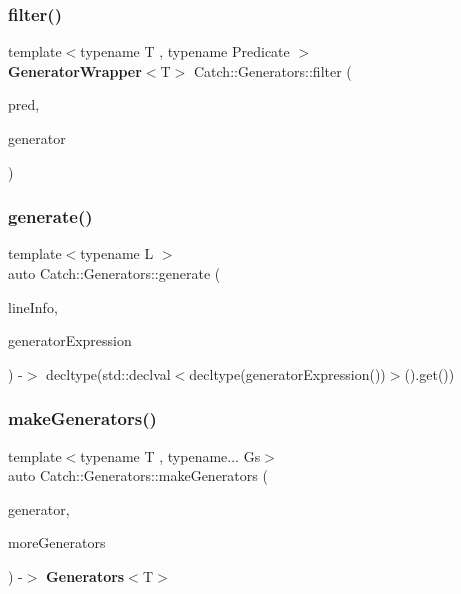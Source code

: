 \mbox{\label{namespace_catch_1_1_generators_afd87f4cbf259f2252aee164d6905b18b}} 
\subsubsection{filter()}
{\footnotesize\ttfamily template$<$typename T , typename Predicate $>$ \\
\textbf{ Generator\+Wrapper}$<$T$>$ Catch\+::\+Generators\+::filter (\begin{DoxyParamCaption}\item[{Predicate \&\&}]{pred,  }\item[{\textbf{ Generator\+Wrapper}$<$ T $>$ \&\&}]{generator }\end{DoxyParamCaption})}

\mbox{\label{namespace_catch_1_1_generators_adbda9e2d18cd3e4dbb124c7d8830c97b}} 
\subsubsection{generate()}
{\footnotesize\ttfamily template$<$typename L $>$ \\
auto Catch\+::\+Generators\+::generate (\begin{DoxyParamCaption}\item[{\textbf{ Source\+Line\+Info} const \&}]{line\+Info,  }\item[{L const \&}]{generator\+Expression }\end{DoxyParamCaption}) -\/$>$ decltype(std\+::declval$<$decltype(generator\+Expression())$>$().get()) }

\mbox{\label{namespace_catch_1_1_generators_adabbca9c7049bd8b5dd0474240108485}} 
\subsubsection{makeGenerators()\hspace{0.1cm}{\footnotesize\ttfamily [1/4]}}
{\footnotesize\ttfamily template$<$typename T , typename... Gs$>$ \\
auto Catch\+::\+Generators\+::make\+Generators (\begin{DoxyParamCaption}\item[{\textbf{ Generator\+Wrapper}$<$ T $>$ \&\&}]{generator,  }\item[{Gs...}]{more\+Generators }\end{DoxyParamCaption}) -\/$>$ \textbf{ Generators}$<$T$>$ }

